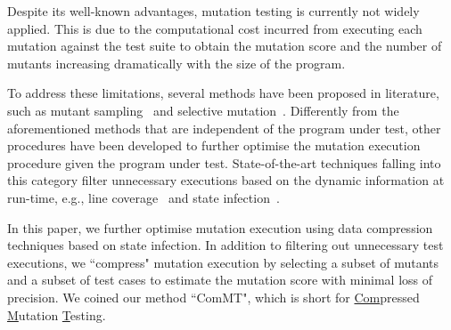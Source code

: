 \documentclass[conference]{IEEEtran} %
\begin{document}
Despite its well-known advantages, mutation testing is currently not widely applied.
This is due to the computational cost incurred from executing each mutation against the test suite 
to obtain the mutation score and the number of mutants increasing dramatically with the size of the program. 

To address these limitations, several methods have been proposed in literature, such as mutant sampling~\cite{acree1980mutation} and selective mutation~\cite{offutt1996experimental}. Differently from the aforementioned methods that are independent of the program under test, other procedures have been developed  
to further optimise the mutation execution procedure given the program under test. State-of-the-art techniques falling into this category filter unnecessary executions based on the dynamic information at run-time, e.g., line coverage~\cite{schuler2009javalanche} and state infection~\cite{just2014efficient}. 

In this paper, we further optimise mutation execution using data compression techniques based on state infection. In addition to filtering out unnecessary test executions, we ``compress" mutation execution by selecting a subset of mutants and a subset of test cases to estimate the mutation score with minimal loss of precision. We coined our method ``ComMT", which is short for \underline{Com}pressed \underline{M}utation \underline{T}esting. 


{\balance}


\end{document}
